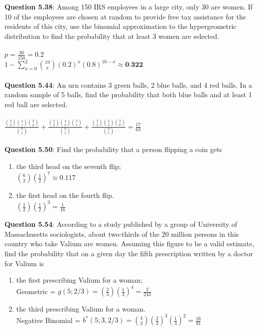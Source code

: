 \documentclass{article}
\begin{document}
    \textbf{Question 5.38}: Among 150 IRS employees in a large city, only
    30 are women. If 10 of the employees are chosen at
    random to provide free tax assistance for the residents
    of this city, use the binomial approximation to the hypergeometric 
    distribution to find the probability that
    at least 3 women are selected.\\\\
        \indent $p = \frac{30}{150} = 0.2$\\
        \indent $1 - \sum_{x=0}^{2}\binom{10}{x}(0.2)^{x}(0.8)^{10-x} \approx \textbf{0.322}$\\\\
    \textbf{Question 5.44}: An urn contains 3 green balls, 2 blue balls, and
    4 red balls. In a random sample of 5 balls, find the
    probability that both blue balls and at least 1 red ball
    are selected.\\\\
        \indent $\frac{\binom{2}{2}\binom{4}{1}\binom{3}{2}}{\binom{9}{5}} + \frac{\binom{2}{2}\binom{4}{2}\binom{3}{1}}{\binom{9}{5}} + \frac{\binom{2}{2}\binom{4}{3}\binom{3}{0}}{\binom{9}{5}} = \frac{17}{63}$\\\\
    \textbf{Question 5.50}: Find the probability that a person flipping a coin
    gets
        \begin{enumerate}[label = (\alph*)]
            \item the third head on the seventh flip;\\
                \indent $\binom{6}{2}(\frac{1}{2})^7 \approx 0.117$ 
            \item the first head on the fourth flip.\\
                \indent $(\frac{1}{2})(\frac{1}{2})^3 = \frac{1}{16}$
        \end{enumerate}
    \textbf{Question 5.54}: According to a study published by a group of
    University of Massachusetts sociologists, about two-thirds 
    of the 20 million persons in this country who
    take Valium are women. Assuming this figure to be a
    valid estimate, find the probability that on a given day
    the fifth prescription written by a doctor for Valium is
        \begin{enumerate}[label = (\alph*)]
            \item the first prescribing Valium for a woman;\\
                \indent Geometric = $g(5;2/3) = (\frac{2}{3})(\frac{1}{3})^4 = \frac{2}{243}$
            \item the third prescribing Valium for a woman.\\
                \indent Negative Binomial = $b^*(5;3,2/3) = \binom{4}{2}(\frac{2}{3})^3(\frac{1}{3})^2 = \frac{16}{81}$
        \end{enumerate}
\end{document}
